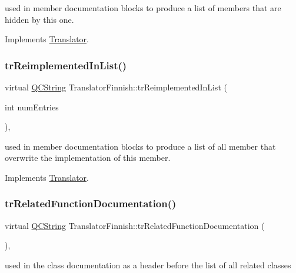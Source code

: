 used in member documentation blocks to produce a list of members that are hidden by this one. 

Implements \mbox{\hyperlink{class_translator}{Translator}}.

\mbox{\label{class_translator_finnish_a40d5e9bc2bb3eff7f87c4bf2418a5517}} 
\subsubsection{\texorpdfstring{trReimplementedInList()}{trReimplementedInList()}}
{\footnotesize\ttfamily virtual \mbox{\hyperlink{class_q_c_string}{Q\+C\+String}} Translator\+Finnish\+::tr\+Reimplemented\+In\+List (\begin{DoxyParamCaption}\item[{int}]{num\+Entries }\end{DoxyParamCaption})\hspace{0.3cm}{\ttfamily [inline]}, {\ttfamily [virtual]}}

used in member documentation blocks to produce a list of all member that overwrite the implementation of this member. 

Implements \mbox{\hyperlink{class_translator}{Translator}}.

\mbox{\label{class_translator_finnish_af103e54c12bb4974301a4dea859dc1c4}} 
\subsubsection{\texorpdfstring{trRelatedFunctionDocumentation()}{trRelatedFunctionDocumentation()}}
{\footnotesize\ttfamily virtual \mbox{\hyperlink{class_q_c_string}{Q\+C\+String}} Translator\+Finnish\+::tr\+Related\+Function\+Documentation (\begin{DoxyParamCaption}{ }\end{DoxyParamCaption})\hspace{0.3cm}{\ttfamily [inline]}, {\ttfamily [virtual]}}

used in the class documentation as a header before the list of all related classes 

